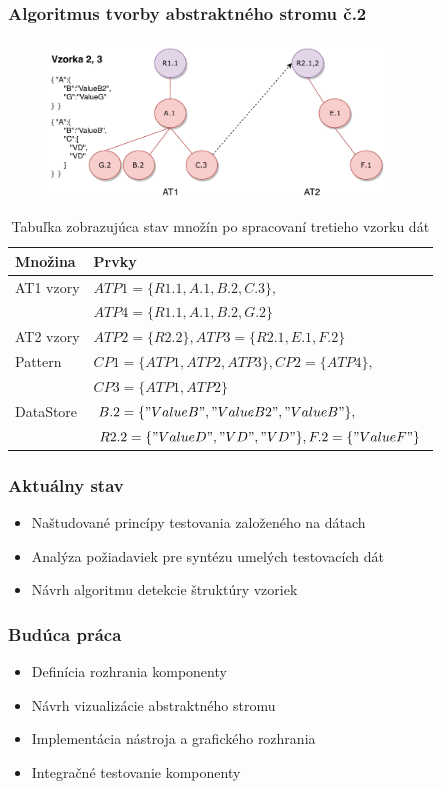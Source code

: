 \documentclass[10pt,xcolor=pdflatex]{beamer}
\begin{document}
\begin{frame}\frametitle{Algoritmus tvorby abstraktného stromu č.2}
	\begin{figure}\centering
		\centering
		\includegraphics[width=3.5in,keepaspectratio]{img/slide_example2.pdf}\\[1pt]
	\end{figure} 
\begin{table}[hbt]
	\centering
	\label{alg_example3_tab}
	\begin{tabular}{|p{1.8cm}|p{9cm}|}
		\hline
		\textbf{Množina} & \textbf{Prvky} \\ \hline
		AT1 vzory & 	\(ATP1 = \{R1.1, A.1, B.2, C.3\},\)\\  
		& \(ATP4 = \{R1.1, A.1, B.2, G.2\}\)   \\ \hline 
		AT2 vzory & 	\(ATP2 = \{R2.2\}, ATP3 = \{R2.1, E.1, F.2 \}  \)   \\ \hline		
		Pattern &\(CP1 = \{ATP1, ATP2, ATP3\}, CP2 = \{ATP4\},\)\\ 
		& \(CP3 = \{ATP1, ATP2\}  \)\\ \hline
		DataStore & 	\(B.2 = \{"ValueB", "ValueB2", "ValueB"\},\)\\
		&  \(R2.2 = \{"ValueD", "VD", "VD"\}, F.2 = \{"ValueF"\}  \)   \\ \hline								
		
	\end{tabular}
	\caption{Tabuľka zobrazujúca stav množín po spracovaní tretieho vzorku dát}
\end{table} 
\end{frame}
\begin{frame}\frametitle{Aktuálny stav}
\begin{itemize}
	\item{Naštudované princípy testovania založeného na dátach
	}
	\item{Analýza požiadaviek pre syntézu umelých testovacích dát  
	}
	\item{Návrh algoritmu detekcie štruktúry vzoriek
	}			
\end{itemize}
\end{frame}
\begin{frame}\frametitle{Budúca práca}
\begin{itemize}
	\item{Definícia rozhrania komponenty
	}
	\item{Návrh vizualizácie abstraktného stromu
	}	
	\item{Implementácia nástroja a grafického rozhrania
	}
	\item{Integračné testovanie komponenty
	}				
\end{itemize}
\end{frame}

\end{document}
